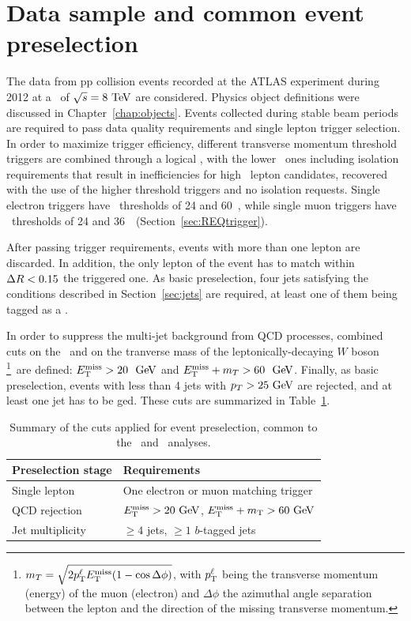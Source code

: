 \section{Data sample and common event preselection}\label{sec:presel}

The data from pp collision events recorded at the ATLAS experiment during
2012 at a \cme\ of $\rts=8\tev$ are considered. Physics object definitions 
were discussed in Chapter~\ref{chap:objects}.
Events collected during
stable beam periods are required to pass data quality requirements and
single lepton trigger selection. In order to maximize trigger
efficiency, different transverse momentum threshold triggers are combined
through a logical \OR, with the lower \pt\ ones including isolation requirements
that result in inefficiencies for high \pt\ lepton candidates, recovered with
the use of the higher threshold triggers and 
no isolation requests. Single electron triggers have
\pt\ thresholds of 24 and 60~\gev, while
single muon triggers have \pt\ thresholds  
of 24 and 36~\gev\ (Section~\ref{sec:REQtrigger}).

After passing trigger requirements, events with more than one lepton are
discarded. In addition, the only lepton of the event has to match within $\dr<0.15$ the
triggered one. As basic preselection, four jets satisfying the conditions
described in Section~\ref{sec:jets} are required, at least one of them
being tagged as a \bjet.

In order to suppress the multi-jet background from QCD processes,
combined cuts on the \met\ and on the tranverse mass of the 
leptonically-decaying $W$ boson \mt\footnote{$\mt = \sqrt{2 p^\ell_{\rm T} \met (1-\cos\Delta\phi)}$, with
$p^\ell_{\rm T}$  being the transverse momentum (energy) of the 
muon (electron) and $\Delta\phi$ the
azimuthal angle separation between the lepton and the direction of
the missing transverse momentum.}\ 
are defined: $\met>20~\gev$ and $\met+\mt>60~\gev$.
Finally, as basic preselection, events with less than 4 jets with
$p_T>25\gev$ are rejected, and at least one jet
has to be \btag ged. These cuts are summarized in
Table~\ref{tab:preselcuts}.

\begin{table}[tb]
\begin{center}
\begin{tabular}{ll}
\toprule
Preselection stage & Requirements \\
\midrule
Single lepton & One electron or muon matching trigger  \\
QCD rejection & $\met >20\gev$, $\met +m_{\rm T}>60\gev$ \\
Jet multiplicity & $\geq 4$ jets, $\geq 1$ $b$-tagged jets \\
\bottomrule\end{tabular}\caption{Summary of the cuts applied for 
event preselection, common to the \wbx\ and \htx\ analyses.}\label{tab:preselcuts}
\end{center}
\end{table}


